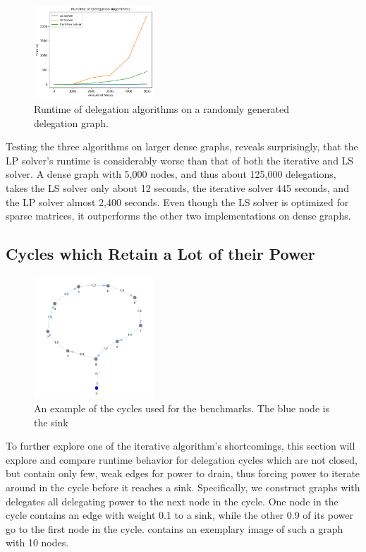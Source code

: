 \begin{figure}[h]
    \centering
    \includegraphics[width=0.4\textwidth]{0-5000_dense}
    \caption{Runtime of delegation algorithms on a randomly generated delegation graph.}
    \label{fig:dense-large}
\end{figure}

Testing the three algorithms on larger dense graphs, reveals surprisingly, that the LP solver's runtime is considerably worse than that of both the iterative and LS solver. A dense graph with 5,000 nodes, and thus about 125,000 delegations, takes the LS solver only about 12 seconds, the iterative solver 445 seconds, and the LP solver almost 2,400 seconds. Even though the LS solver is optimized for sparse matrices, it outperforms the other two implementations on dense graphs.


\subsection{Cycles which Retain a Lot of their Power}
\label{subsec:cycles_draining}

\begin{figure}[h]
	\centering
	\includegraphics[width=0.4\textwidth]{big_cycle_example}
	\caption{An example of the cycles used for the benchmarks. The blue node is the sink}
	\label{fig:big_cycle_example}
\end{figure}

To further explore one of the iterative algorithm's shortcomings, this section will explore and compare runtime behavior for delegation cycles which are not closed, but contain only few, weak edges for power to drain, thus forcing power to iterate around in the cycle before it reaches a sink. Specifically, we construct graphs with delegates all delegating power to the next node in the cycle. One node in the cycle contains an edge with weight 0.1 to a sink, while the other 0.9 of its power go to the first node in the cycle.  contains an exemplary image of such a graph with 10 nodes. 

